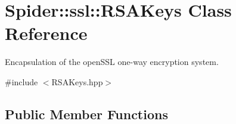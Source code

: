 \hypertarget{class_spider_1_1ssl_1_1_r_s_a_keys}{}\section{Spider\+:\+:ssl\+:\+:R\+S\+A\+Keys Class Reference}
\label{class_spider_1_1ssl_1_1_r_s_a_keys}


Encapsulation of the open\+S\+SL one-\/way encryption system.  




{\ttfamily \#include $<$R\+S\+A\+Keys.\+hpp$>$}

\subsection*{Public Member Functions}
